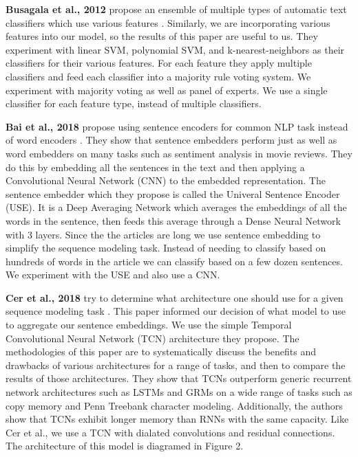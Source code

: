 \documentclass[11pt,a4paper]{article}
\begin{document}
\textbf{Busagala et al., 2012} propose an ensemble of multiple types of automatic text classifiers which use various features \citep{6195332}. Similarly, we are incorporating various features into our model, so the results of this paper are useful to us. They experiment with linear SVM, polynomial SVM, and k-nearest-neighbors as their classifiers for their various features. For each feature they apply multiple classifiers and feed each classifier into a majority rule voting system. We experiment with majority voting as well as panel of experts. We use a single classifier for each feature type, instead of multiple classifiers.

\textbf{Bai et al., 2018} propose using sentence encoders for common NLP task instead of word encoders \citep{DBLP:journals/corr/abs-1803-01271}. They show that sentence embedders perform just as well as word embedders on many tasks such as sentiment analysis in movie reviews. They do this by embedding all the sentences in the text and then applying a Convolutional Neural Network (CNN) to the embedded representation. The sentence embedder which they propose is called the Univeral Sentence Encoder (USE). It is a Deep Averaging Network which averages the embeddings of all the words in the sentence, then feeds this average through a Dense Neural Network with 3 layers. Since the the articles are long we use sentence embedding to simplify the sequence modeling task. Instead of needing to classify based on hundreds of words in the article we can classify based on a few dozen sentences. We experiment with the USE and also use a CNN. 

\textbf{Cer et al., 2018} try to determine what architecture one should use for a given sequence modeling task \citep{DBLP:journals/corr/abs-1803-11175}. This paper informed our decision of what model to use to aggregate our sentence embeddings. We  use the simple Temporal Convolutional Neural Network (TCN) architecture they propose. The methodologies of this paper are to systematically discuss the benefits and drawbacks of various architectures for a range of tasks, and then to compare the results of those architectures. They show that TCNs outperform generic recurrent network architectures such as LSTMs and GRMs on a wide range of tasks such as copy memory and Penn Treebank character modeling. Additionally, the authors show that TCNs exhibit longer memory than RNNs with the same capacity. Like Cer et al., we use a TCN with dialated convolutions and residual connections. The architecture of this model is diagramed in Figure 2.
\end{document}
